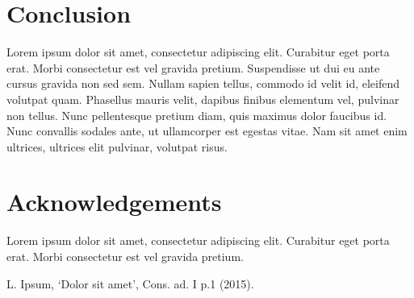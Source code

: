 \documentclass[10pt]{article}
\begin{document}
\section{Conclusion}
Lorem ipsum dolor sit amet, consectetur adipiscing elit. Curabitur eget porta erat. Morbi consectetur est vel gravida pretium. Suspendisse ut dui eu ante cursus gravida non sed sem. Nullam sapien tellus, commodo id velit id, eleifend volutpat quam. Phasellus mauris velit, dapibus finibus elementum vel, pulvinar non tellus. Nunc pellentesque pretium diam, quis maximus dolor faucibus id. Nunc convallis sodales ante, ut ullamcorper est egestas vitae. Nam sit amet enim ultrices, ultrices elit pulvinar, volutpat risus.

\section*{Acknowledgements}
Lorem ipsum dolor sit amet, consectetur adipiscing elit. Curabitur eget porta erat. Morbi consectetur est vel gravida pretium. 


\nolinenumbers

\begin{thebibliography}{99}
 L. Ipsum, `Dolor sit amet', Cons. ad. I p.1 (2015).
\end{thebibliography}

\end{document}

